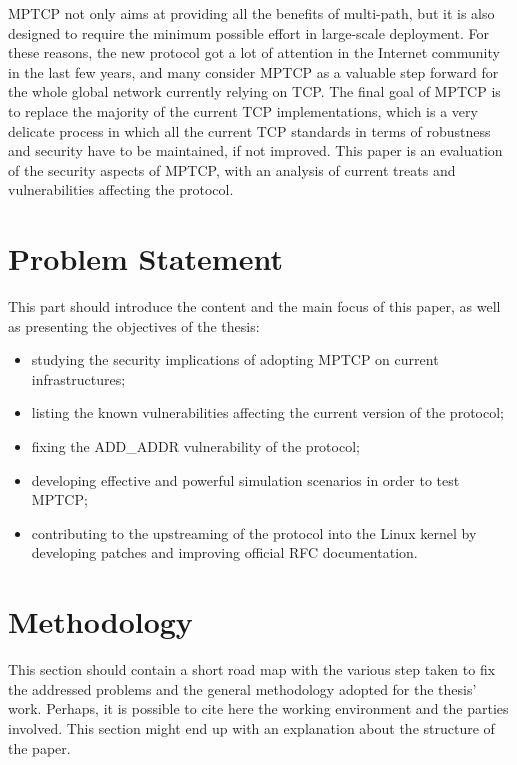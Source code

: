 \vspace{5mm}
MPTCP not only aims at providing all the benefits of multi-path, but it is also designed to require the minimum possible effort in large-scale deployment. For these reasons, the new protocol got a lot of attention in the Internet community in the last few years, and many consider MPTCP as a valuable step forward for the whole global network currently relying on TCP.
The final goal of MPTCP is to replace the majority of the current TCP implementations, which is a very delicate process in which all the current TCP standards in terms of robustness and security have to be maintained, if not improved. This paper is an evaluation of the security aspects of MPTCP, with an analysis of current treats and vulnerabilities affecting the protocol.

\section{Problem Statement}
This part should introduce the content and the main focus of this paper, as well as presenting the objectives of the thesis:
\begin{itemize}
    \item studying the security implications of adopting MPTCP on current infrastructures; 
    \item listing the known vulnerabilities affecting the current version of the protocol; 
    \item fixing the ADD\_ADDR vulnerability of the protocol; 
    \item developing effective and powerful simulation scenarios in order to test MPTCP;
    \item contributing to the upstreaming of the protocol into the Linux kernel by developing patches and improving official RFC documentation.
\end{itemize}

\section{Methodology}
This section should contain a short road map with the various step taken to fix the addressed problems and the general methodology adopted for the thesis' work.
Perhaps, it is possible to cite here the working environment and the parties involved. 
This section might end up with an explanation about the structure of the paper.
